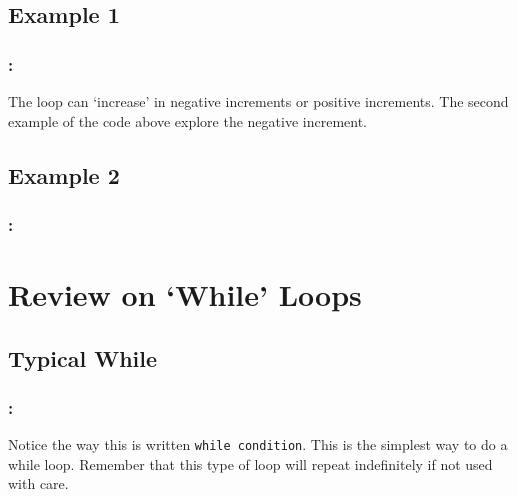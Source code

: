 \documentclass[11pt]{beamer}
\begin{document}
\subsection{Example 1}

\begin{frame}
	\frametitle{\secname: \subsecname}
	\vspace{-2mm}
	
	\begin{exampleblock}{}
		The loop can `increase' in negative increments or positive increments. The second example of the code above explore the negative increment. 
	\end{exampleblock}
\end{frame}

\subsection{Example 2}

\begin{frame}[fragile]
	\frametitle{\secname: \subsecname}
	\vspace{-2mm}
	
\end{frame}

\section{Review on `While' Loops}
\subsection{Typical While}

\begin{frame}[fragile]
	\frametitle{\secname: \subsecname}
	\vspace{-2mm}
	
	
	\begin{alertblock}{}
		Notice the way this is written \verb|while condition|. This is the simplest way to do a while loop. Remember that this type of loop will repeat indefinitely if not used with care. 
	\end{alertblock}
\end{frame}
\end{document}
